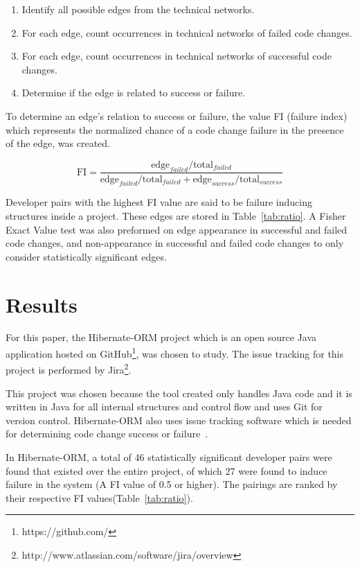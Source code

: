 \documentclass[conference]{IEEEtran}
\begin{document}
\begin{enumerate}
\item Identify all possible edges from the technical networks.
\item For each edge, count occurrences in technical networks of failed code changes.
\item For each edge, count occurrences in technical networks of successful code changes.
\item Determine if the edge is related to success or failure.
\end{enumerate}

To determine an edge's relation to success or failure,  the value FI (failure
index) which represents the normalized chance of a code change failure in the presence
of the edge, was created. 

\begin{equation}
\text{FI} = \frac{ \text{edge}_{failed} / \text{total}_{failed}}{\text{edge}_{failed} / \text{total}_{failed} + \text{edge}_{success} / \text{total}_{success}}
\end{equation}

Developer pairs with the highest FI value are said to be failure inducing structures
inside a project. These edges are stored in Table~\ref{tab:ratio}. A Fisher Exact Value test 
was also preformed on edge appearance in successful and failed
code changes, and non-appearance in successful and failed code changes to only
consider statistically significant edges. 


\section{Results}
For this paper, the Hibernate-ORM project which is an open source Java 
application hosted on GitHub\footnote{https://github.com/}, was chosen to study. The issue tracking for this 
project is performed by Jira\footnote{http://www.atlassian.com/software/jira/overview}.

This project was chosen because the tool created only handles Java code and it is written in Java 
for all internal structures and control flow
and uses Git for version control. Hibernate-ORM also uses issue tracking software which 
is needed for determining code change success or failure~\cite{Sliwerski:2005:CIF}.

In Hibernate-ORM, a total of 46 statistically significant developer pairs were found that existed over the entire project, 
of which 27 were found to induce failure in the system (A FI value of 0.5 or higher). 
The pairings are ranked by their respective FI values(Table~\ref{tab:ratio}).
\end{document}
